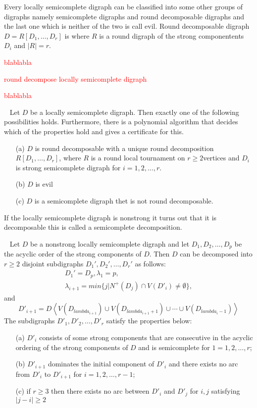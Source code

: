 
Every locally semicomplete digraph can be classified into some other groups of digraphs namely semicomplete digraphs and round decomposable digraphs and the last one which is neither of the two is call evil. Round decomposable digraph $D=R[D_1,\dots,D_r]$ is where $R$ is a round digraph of the strong componentents $D_i$ and $|R|=r$.

\textcolor{red}{blablabla}
\begin{thm}
    \textcolor{red}{round decompose locally semicomplete digraph}
\end{thm}
\textcolor{red}{blablabla}
\begin{thm}~\cite{bangJGT85}
    Let $D$ be a locally semicomplete digraph. Then exactly one of the following possibilities holds. Furthermore, there is a polynomial algorithm that decides which of the properties hold and gives a certificate for this.
    \begin{itemize}
        \item[(a)] $D$ is round decomposable with a unique round decomposition $R[D_1,\dots ,D_r]$, where $R$ is a round local tournament on $r\geq 2$vertices and $D_i$ is strong semicomplete digraph for $i=1,2,\dots,r$.
        \item[(b)] $D$ is evil 
        \item[(c)] $D$ is a semicomplete digraph thet is not round decomposable. 
    \end{itemize}
\end{thm}
If the locally semicomplete digraph is nonstrong it turns out that it is decomposable this is called a semicomplete decomposition.
\begin{thm}~\cite{bangJGT85,banggutin,bangJCT102}
    Let $D$ be a nonstrong locally semicomplete digraph and let $D_1,D_2,\dots,D_p$ be the acyclic order of the strong components of $D$. Then $D$ can be decomposed into $r\geq 2$ disjoint subdigraphs $D_1',D_2',\dots, D_r'$ as follows:
    \begin{align*}
        D_1'=D_p, \lambda_1=p,\\
        \lambda_{i+1}=min\lbrace j|N^+(D_j)\cap V(D'_i)\neq \emptyset\rbrace,
    \end{align*}
    and
    \begin{equation*}
        D'_{i+1}=D\left<V(D_{lambda_{i+1}})\cup V(D_{lambda_{i+1}+1})\cup \cdots \cup V(D_{lambda_{i}-1})\right>
    \end{equation*}
    The subdigraphs $D'_1,D'_2,\dots,D'_r$ satisfy the properties below:
    \begin{itemize}
        \item[(a)] $D'_i$ consists of some strong components that are consecutive in the acyclic ordering of the strong components of $D$ and is semicomplete for $1=1,2,\dots,r$;
        \item[(b)] $D'_{i+1}$ dominates the initial component of $D'_i$ and there exists no arc from $D'_i$ to $D'_{i+1}$ for $i=1,2,\dots,r-1$;
        \item[(c)] if $r\geq 3$ then there exists no arc between $D'_i$ and $D'_j$ for $i,j$ satisfying $|j-i|\geq 2$  
    \end{itemize}
    \label{thm:semicompletedecom}
\end{thm}
